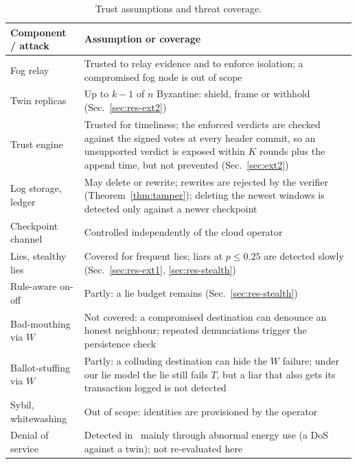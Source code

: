 \documentclass{ieeeaccess}
\begin{document}
\begin{table}[!t]
\caption{Trust assumptions and threat coverage.}
\label{tab:threats}
\centering
\renewcommand{\arraystretch}{1.1}
\footnotesize
\setlength{\tabcolsep}{2.5pt}
\begin{tabular}{p{} p{}}
\toprule
\textbf{Component / attack} & \textbf{Assumption or coverage} \\
\midrule
Fog relay & Trusted to relay evidence and to enforce isolation; a compromised fog node is out of scope \\
Twin replicas & Up to $k-1$ of $n$ Byzantine: shield, frame or withhold (Sec.~\ref{sec:res-ext2}) \\
Trust engine & Trusted for timeliness; the enforced verdicts are checked against the signed votes at every header commit, so an unsupported verdict is exposed within $K$ rounds plus the append time, but not prevented (Sec.~\ref{sec:ext2}) \\
Log storage, ledger & May delete or rewrite; rewrites are rejected by the verifier (Theorem~\ref{thm:tamper}); deleting the newest windows is detected only against a newer checkpoint \\
Checkpoint channel & Controlled independently of the cloud operator \\
\midrule
Lies, stealthy lies & Covered for frequent lies; liars at $p\le0.25$ are detected slowly (Sec.~\ref{sec:res-ext1}, \ref{sec:res-stealth}) \\
Rule-aware on-off & Partly: a lie budget remains (Sec.~\ref{sec:res-stealth}) \\
Bad-mouthing via $W$ & Not covered: a compromised destination can denounce an honest neighbour; repeated denunciations trigger the persistence check \\
Ballot-stuffing via $W$ & Partly: a colluding destination can hide the $W$ failure; under our lie model the lie still fails $T$, but a liar that also gets its transaction logged is not detected \\
Sybil, whitewashing & Out of scope: identities are provisioned by the operator~\cite{douceur2002sybil,friedman2001social} \\
Denial of service & Detected in~\cite{soula2024iodt} mainly through abnormal energy use (a DoS against a twin); not re-evaluated here \\
\bottomrule
\end{tabular}
\end{table}

\end{document}
